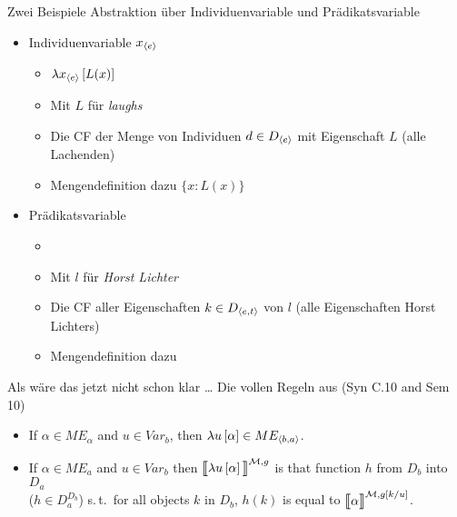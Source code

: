 \begin{frame}
  {Zwei Beispiele}
  \onslide<+->
  \onslide<+->
  Abstraktion über \alert{Individuenvariable} und \alert{Prädikatsvariable}\\
  \Halbzeile
  \begin{itemize}[<+->]
    \item Individuenvariable \alert{$x_{{\langle{}e\rangle}}$} 
      \begin{itemize}[<+->]
        \item \alert{$\lambda{}x_{{\langle{}e\rangle}}\left[{}L(x)\right]$}
        \item Mit $L$ \zB für \textit{laughs}
        \item Die CF der Menge von Individuen $d\in{}D_{{\langle{}e\rangle}}$ mit Eigenschaft $L$ (alle Lachenden)
        \item Mengendefinition dazu \alert{$\{x: L(x)\}$}
      \end{itemize}
      \Halbzeile
    \item Prädikatsvariable  
      \begin{itemize}[<+->]
        \item {}
        \item Mit $l$ \zB für \textit{Horst Lichter}
        \item Die CF aller Eigenschaften $k\in{}D_{{\langle{}e,t\rangle}}$ von $l$ (alle Eigenschaften Horst Lichters)
        \item Mengendefinition dazu 
      \end{itemize}
  \end{itemize}
\end{frame}

\begin{frame}
  {Als wäre das jetzt nicht schon klar \ldots}
  \onslide<+->
  \onslide<+->
  Die vollen Regeln aus \citet[102]{DowtyEa1981} (Syn C.10 and Sem 10)\\
  \Halbzeile
    \begin{itemize}[<+->]
      \item If $\alpha\in{}ME_{\alpha}$ and $u\in{}Var_b$, then $\lambda{}u\left[{}\alpha\right]\in{}ME_{{\langle{}b,a\rangle}}$.
      \item If $\alpha\in{}ME_a$ and $u\in{}Var_b$ then $\DEM{\lambda{}u\ekm{\alpha}}$ is that function $h$ from $D_b$ into $D_a$\\
        ($h\in D_a^{D_b}$) s.\,t.\ for all objects $k$ in $D_b$, $h(k)$ is equal to $\Dem{\alpha}{\mMm,g\ekm{k/u}}$.
    \end{itemize}
  \Halbzeile
\end{frame}


